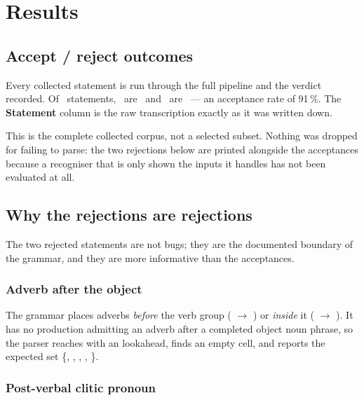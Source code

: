 \section{Results}\label{sec:results}

\subsection{Accept / reject outcomes}

Every collected statement is run through the full pipeline and the verdict recorded. Of
\CorpusTotal\ statements, \CorpusAccepted\ are \accepted\ and \CorpusRejected\ are
\rejected\ --- an acceptance rate of 91\,\%. The \textbf{Statement} column is the raw
transcription exactly as it was written down.



\begin{keypoint}
This is the complete collected corpus, not a selected subset. Nothing was dropped for
failing to parse: the two rejections below are printed alongside the acceptances because a
recogniser that is only shown the inputs it handles has not been evaluated at all.
\end{keypoint}

\subsection{Why the rejections are rejections}

The two rejected statements are not bugs; they are the documented boundary of the
grammar, and they are more informative than the acceptances.

\subsubsection*{Adverb after the object}

The grammar places adverbs \emph{before} the verb group
( $\rightarrow$  ) or \emph{inside} it
( $\rightarrow$  ). It has no production
admitting an adverb after a completed object noun phrase, so the parser reaches
 with an  lookahead, finds an empty cell, and reports the expected
set \{, , , , \}.

\subsubsection*{Post-verbal clitic pronoun}

